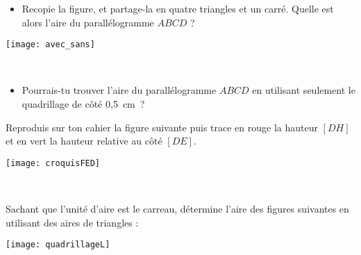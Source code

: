 \begin{exercice}
\begin{minipage}[c]{0.48\linewidth}
\begin{itemize}
 \item Recopie la figure, et partage-la en quatre triangles et un carré. Quelle est alors l'aire du parallélogramme $ABCD$ ?
 \end{itemize}
 \end{minipage} \hfill%
 \begin{minipage}[c]{0.48\linewidth}
\begin{center} \texttt{[image: avec\_sans]} \end{center} 
  \end{minipage} \\
  \begin{itemize}
   \item Pourrais-tu trouver l'aire du parallélogramme $ABCD$ en utilisant seulement le quadrillage de côté 0,5 cm ? 
   \end{itemize}
\end{exercice}


\begin{exercice}
\begin{minipage}[c]{0.48\linewidth}
Reproduis sur ton cahier la figure suivante puis trace en rouge la hauteur $[DH]$ et en vert la hauteur relative au côté $[DE]$.
 \end{minipage} \hfill%
 \begin{minipage}[c]{0.48\linewidth}
\begin{center} \texttt{[image: croquisFED]} \end{center} 
  \end{minipage} \\
\end{exercice}


\begin{exercice}
Sachant que l'unité d'aire est le carreau, détermine l'aire des figures suivantes en utilisant des aires de triangles :
\begin{center} \texttt{[image: quadrillageL]} \end{center} 
\end{exercice}


